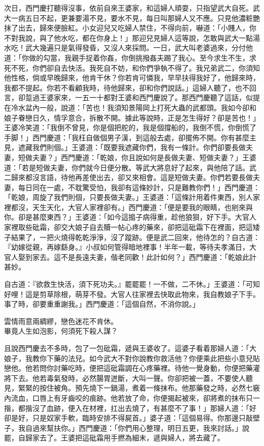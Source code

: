 次日，西門慶打聽得沒事，依前自來王婆家，和這婦人頑耍，只指望武大自死。武大一病五日不起，更兼要湯不見，要水不見，每日叫那婦人又不應。只見他濃粧艷抹了出去，歸來便臉紅。小女迎兒又吃婦人禁住，不得向前，嚇道：「小賤人，你不對我說，與了他水吃，都在你身上！」那迎兒見婦人這等說，怎敢與武大一點湯水吃！武大幾遍只是氣得發昏，又沒人來採問。一日，武大叫老婆過來，分付他道：「你做的勾當，我親手捉着你姦，你倒挑撥姦夫踢了我心。至今求生不生，求死不死，你們卻自去快活。我死自不妨，和你們爭執不得了。我兄弟武二，你須知他性格，倘或早晚歸來，他肯干休？你若肯可憐我，早早扶得我好了，他歸來時，我都不提起。你若不看顧我時，待他歸來，卻和你們說話。」這婦人聽了，也不回言，卻踅過王婆家來，一五一十都對王婆和西門慶說了。那西門慶聽了這話，似提在冷水盆內一般，說道：「苦也！我須知景陽岡上打死大蟲的武都頭。我如今卻和娘子眷戀日久，情孚意合，拆散不開。據此等說時，正是怎生得好？卻是苦也！」王婆冷笑道：「我倒不曾見，你是個把舵的，我是個撐船的，我倒不慌，你倒慌了手脚！」西門慶道：「我枉自做個男子漢，到這般去處，卻擺佈不開。你有甚麼主見，遮藏我們則個。」王婆道：「既要我遮藏你們，我有一條計。你們卻要長做夫妻，短做夫妻？」{}西門慶道：「乾娘，你且說如何是長做夫妻、短做夫妻？」王婆道：「若是短做夫妻，你們就今日便分散。等武大將息好了起來，與他陪了話。武二歸來都沒言語，待他再差使出去，卻又來相會。這是短做夫妻。你們若要長做夫妻，每日同在一處，不耽驚受怕，我卻有這條妙計，只是難教你們！」西門慶道：「乾娘，周旋了我們則個，只要長做夫妻。」王婆道：「這條計用着件東西，別人家裡都沒，天生天化，大官人家裡卻有。」西門慶道：「便是要我的眼睛，也剜來與你。卻是甚麼東西？」王婆道：「如今這搗子病得重，趁他狼狽，好下手。{}大官人家裡取些砒霜，卻交大娘子自去贖一帖心疼的藥來，卻把這砒霜下在裡面，把這矮子結果了，一把火燒得乾乾淨淨，沒了蹤跡。便是武二回來，他待怎的？自古道：『幼嫁從親，再嫁繇身。』小叔如何管得暗地裡事！半年一載，等待夫孝滿日，大官人娶到家去。這不是長遠夫妻，偕老同歡！此計如何？」西門慶道：「乾娘此計甚妙。

自古道：『欲救生快活，須下死功夫。』罷罷罷！一不做，二不休。」王婆道：「可知好哩！這是剪草除根，萌芽不發。{}大官人往家裡去快取此物來，我自教娘子下手。事了時，卻要重重謝我。」西門慶道：「這個自然，不消你說。」

\begin{myquote} 
雲情雨意兩綢繆，戀色迷花不肯休。\\畢竟人生如泡影，何須死下殺人謀？
\end{myquote} 

且說西門慶去不多時，包了一包砒霜，遞與王婆收了。這婆子看着那婦人道：「大娘子，我教你下藥的法兒。如今武大不對你說教你救活他？你便乘此把些小意兒貼戀他。他若問你討藥吃時，便把這砒霜調在心疼藥裡。待他一覺身動，你便把藥灌將下去。他若毒氣發時，必然腸胃迸斷，大叫一聲。你卻把被一蓋，不要使人聽見，緊緊的按住被角。{}預先燒下一鍋湯，煮着一條抹布。他那藥發之時，必然七竅內流血，口唇上有牙齒咬的痕跡。他若放了命，你便揭起被來，卻將煮的抹布只一揩，都揩沒了血跡，便入在材裡，扛出去燒了，有甚麼不了事！」那婦人道：「好卻是好，{}只是奴家手軟，臨時安排不得屍首。」婆子道：「這個易得。你那邊只敲壁子，我自過來幫扶你。」西門慶道：「你們用心整理，明日五更，我來討話。」說罷，自歸家去了。王婆把這砒霜用手撚為細末，遞與婦人，將去藏了。

